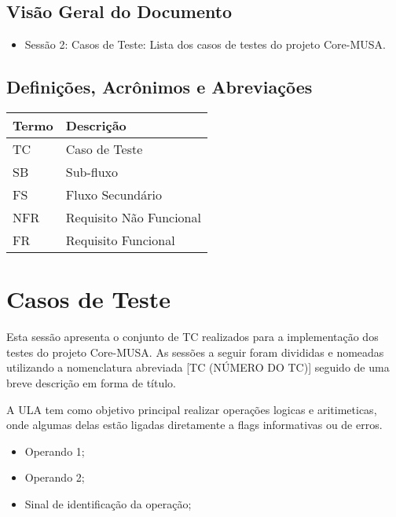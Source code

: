 \documentclass{article}
\begin{document}
  \subsection{Visão Geral do Documento}
  \begin{itemize}
    \item Sessão 2: Casos de Teste: Lista dos casos de testes do projeto Core-MUSA.
  \end{itemize}
  
  \subsection{Definições, Acrônimos e Abreviações}
  \FloatBarrier
    \begin{table}[H] 
      \begin{center}
        \begin{tabular}[pos]{|m{2cm} | m{8cm}|} 
          \hline 
          \cellcolor[gray]{0.9}\textbf{Termo} & \cellcolor[gray]{0.9}\textbf{Descrição} \\ \hline
          TC & Caso de Teste  \\ \hline
          SB & Sub-fluxo \\ \hline
          FS & Fluxo Secundário \\ \hline
          NFR & Requisito Não Funcional \\ \hline
          FR & Requisito Funcional \\
          \hline
        \end{tabular}
      \end{center}
    \label{tab:definicoes}
    \end{table}
  
  \section{Casos de Teste}
  Esta sessão apresenta o conjunto de TC realizados para a implementação dos testes do projeto Core-MUSA. As sessões a seguir foram divididas e nomeadas utilizando a nomenclatura abreviada [TC (NÚMERO DO TC)] seguido de uma breve descrição em forma de título.

A ULA tem como objetivo principal realizar operações logicas e aritimeticas, onde algumas delas estão ligadas diretamente a flags informativas ou de erros.
  
  	\begin{itemize}
     \item Operando 1;
     \item Operando 2;
     \item Sinal de identificação da operação;
     \end{itemize}
    
\end{document}

